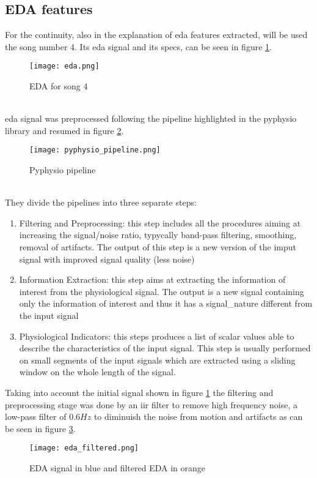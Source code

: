\subsection{EDA features}
For the continuity, also in the explanation of \gls{eda} features extracted, will be used the song number 4. Its \gls{eda} signal and its specs, can be seen in figure \ref{fig:eda}.
\begin{figure}[h]
    \centering
    \texttt{[image: eda.png]} 
	\caption{EDA for song 4}
    \label{fig:eda}
\end{figure}
\\
\gls{eda} signal was preprocessed following the pipeline highlighted in the pyphysio library \cite{bizzego2019pyphysio} and resumed in figure \ref{fig:pyphysio_pipeline}.
\begin{figure}[h]
    \centering
    \texttt{[image: pyphysio\_pipeline.png]} 
	\caption{Pyphysio pipeline}
    \label{fig:pyphysio_pipeline}
\end{figure}
\\
They divide the pipelines into three separate steps:
\begin{enumerate}
	\item Filtering and Preprocessing: this step includes all the procedures aiming at increasing the signal/noise ratio, typycally band-pass filtering, smoothing, removal of artifacts. The output of this step is a new version of the imput signal with improved signal quality (less noise)
	\item Information Extraction: this step aims at extracting the information of interest from the physiological signal. The output is a new signal containing only the information of interest and thus it has a signal\_nature different from the input signal
	\item Physiological Indicators: this steps produces a list of scalar values able to describe the characteristics of the input signal. This step is usually performed on small segments of the input signals which are extracted using a sliding window on the whole length of the signal.
\end{enumerate}
Taking into account the initial signal shown in figure \ref{fig:eda} the filtering and preprocessing stage was done by an \gls{iir} filter to remove high frequency noise, a low-pass filter of $0.6Hz$ to diminuish the noise from motion and artifacts as can be seen in figure \ref{fig:eda_filtered}.
\begin{figure}[h]
    \centering
    \texttt{[image: eda\_filtered.png]} 
	\caption{EDA signal in blue and filtered EDA in orange}
    \label{fig:eda_filtered}
\end{figure}
